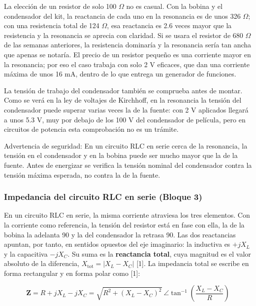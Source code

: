 \documentclass[11pt,letterpaper]{article}
\begin{document}
La elección de un resistor de solo 100 \ensuremath{\Omega} no es casual. Con la bobina y el condensador del kit, la reactancia de cada uno en la resonancia es de unos 326 \ensuremath{\Omega}; con una resistencia total de 124 \ensuremath{\Omega}, esa reactancia es 2.6 veces mayor que la resistencia y la resonancia se aprecia con claridad. Si se usara el resistor de 680 \ensuremath{\Omega} de las semanas anteriores, la resistencia dominaría y la resonancia sería tan ancha que apenas se notaría. El precio de un resistor pequeño es una corriente mayor en la resonancia; por eso el caso trabaja con solo 2 V eficaces, que dan una corriente máxima de unos 16 mA, dentro de lo que entrega un generador de funciones.

La tensión de trabajo del condensador también se comprueba antes de montar. Como se verá en la ley de voltajes de Kirchhoff, en la resonancia la tensión del condensador puede superar varias veces la de la fuente: con 2 V aplicados llegará a unos 5.3 V, muy por debajo de los 100 V del condensador de película, pero en circuitos de potencia esta comprobación no es un trámite.

\begin{nota}{Advertencia de seguridad:}
En un circuito RLC en serie cerca de la resonancia, la tensión en el condensador y en la bobina puede ser mucho mayor que la de la fuente. Antes de energizar se verifica la tensión nominal del condensador contra la tensión máxima esperada, no contra la de la fuente.
\end{nota}

\subsubsection{Impedancia del circuito RLC en serie (Bloque 3)}

En un circuito RLC en serie, la misma corriente atraviesa los tres elementos. Con la corriente como referencia, la tensión del resistor está en fase con ella, la de la bobina la adelanta 90\textdegree{} y la del condensador la retrasa 90\textdegree{}. Las dos reactancias apuntan, por tanto, en sentidos opuestos del eje imaginario: la inductiva es $+jX_L$ y la capacitiva $-jX_C$. Su suma es la \textbf{reactancia total}, cuya magnitud es el valor absoluto de la diferencia, $X_{\mathrm{tot}} = |X_L - X_C|$ [1]. La impedancia total se escribe en forma rectangular y en forma polar como [1]:

\begin{equation}
  \mathbf{Z} = R + jX_L - jX_C = \sqrt{R^{2} + (X_L - X_C)^{2}}\ \angle \tan^{-1}\!\left(\frac{X_L - X_C}{R}\right)
\end{equation}
\end{document}
